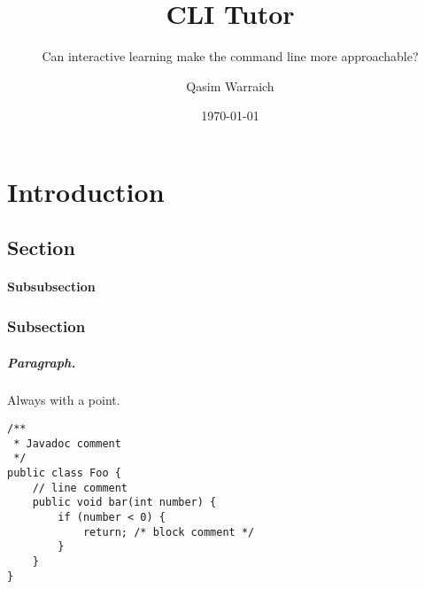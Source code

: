 \documentclass{seal_thesis}
\date{\today}
\title{CLI Tutor}
\subtitle{Can interactive learning make the command line more approachable?}
\author{Qasim Warraich}
\begin{document}
\maketitle

\frontmatter


\begin{abstract}
\end{abstract}


\begin{zusammenfassung}
\end{zusammenfassung}

\tableofcontents
\listoffigures
\listoftables
\lstlistoflistings

\mainmatter
\chapter{Introduction}
\section{Section}
%
\subsubsection{Subsubsection}

\subsection{Subsection}
%


\paragraph{Paragraph.} Always with a point.

\begin{lstlisting}[caption=An example code snippet]
/**
 * Javadoc comment
 */
public class Foo {
	// line comment
	public void bar(int number) {
		if (number < 0) {
			return; /* block comment */
		}
	}
}
\end{lstlisting}

\backmatter



\end{document}
